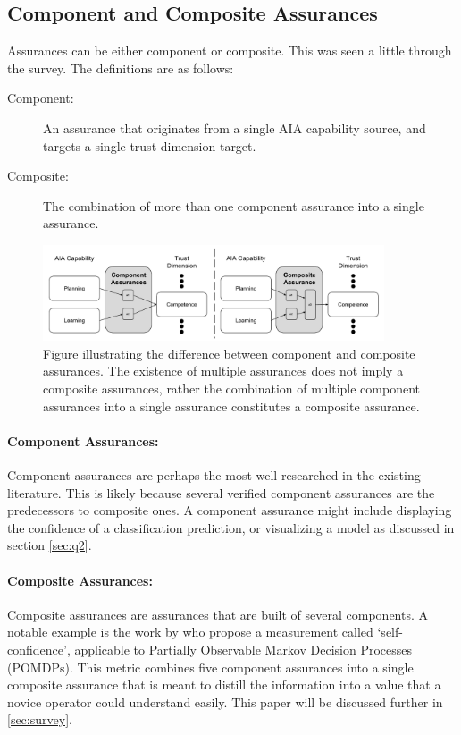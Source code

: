 \subsection{Component and Composite Assurances}
Assurances can be either component or composite. This was seen a little through the survey. The definitions are as follows:

\begin{description}
    \item [Component:] An assurance that originates from a single AIA capability source, and targets a single trust dimension target.
    \item [Composite:] The combination of more than one component assurance into a single assurance. 
\end{description}

\begin{figure}[!htbp]
    \centering
    \includegraphics[width=0.9\textwidth]{Figures/Assurance_component_composite.pdf}
    \caption{Figure illustrating the difference between component and composite assurances. The existence of multiple assurances does not imply a composite assurances, rather the combination of multiple component assurances into a single assurance constitutes a composite assurance.}
    \label{fig:assurance_mapping}
\end{figure}

\paragraph{Component Assurances:} Component assurances are perhaps the most well researched in the existing literature. This is likely because several verified component assurances are the predecessors to composite ones. A component assurance might include displaying the confidence of a classification prediction, or visualizing a model as discussed in section \ref{sec:q2}.

\paragraph{Composite Assurances:} Composite assurances are assurances that are built of several components. A notable example is the work by \citet{Aitken2016-cv} who propose a measurement called `self-confidence', applicable to Partially Observable Markov Decision Processes (POMDPs). This metric combines five component assurances into a single composite assurance that is meant to distill the information into a value that a novice operator could understand easily. This paper will be discussed further in \ref{sec:survey}. 

